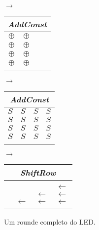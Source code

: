 \documentclass[runningheads,a4paper,11pt]{llncs}
\begin{document}
\begin{figure}
	\centering
	\caption{Um rounde completo do LED.\label{figura:round}}
	$\rightarrow$
	\begin{tabular}{|c|c|c|c|}
		\multicolumn{4}{c}{\textit{AddConst}}\\\hline
		$\oplus$&$\oplus$&&\\\hline
		$\oplus$&$\oplus$&&\\\hline
		$\oplus$&$\oplus$&&\\\hline
		$\oplus$&$\oplus$&&\\\hline
		\multicolumn{1}{c}{ \hspace{.5cm} }&\multicolumn{1}{c}{ \hspace{.5cm} }&\multicolumn{1}{c}{ \hspace{.5cm} }&\multicolumn{1}{c}{ \hspace{.5cm} }\\
	\end{tabular} $\rightarrow$
	\begin{tabular}{|c|c|c|c|}
		\multicolumn{4}{c}{\textit{AddConst}}\\\hline
		$S$&$S$&$S$&$S$\\\hline
		$S$&$S$&$S$&$S$\\\hline
		$S$&$S$&$S$&$S$\\\hline
		$S$&$S$&$S$&$S$\\\hline
		\multicolumn{1}{c}{ \hspace{.5cm} }&\multicolumn{1}{c}{ \hspace{.5cm} }&\multicolumn{1}{c}{ \hspace{.5cm} }&\multicolumn{1}{c}{ \hspace{.5cm} }\\
	\end{tabular} $\rightarrow$
	\begin{tabular}{|c|c|c|c|}
		\multicolumn{4}{c}{\textit{ShiftRow}}\\\hline
		&&&\\\hline
		&&&$\leftarrow$\\\hline
		&&$\leftarrow$&$\leftarrow$\\\hline
		&$\leftarrow$&$\leftarrow$&$\leftarrow$\\\hline
		\multicolumn{1}{c}{ \hspace{.5cm} }&\multicolumn{1}{c}{ \hspace{.5cm} }&\multicolumn{1}{c}{ \hspace{.5cm} }&\multicolumn{1}{c}{ \hspace{.5cm} }\\

\end{tabular}
\end{figure}
\end{document}
